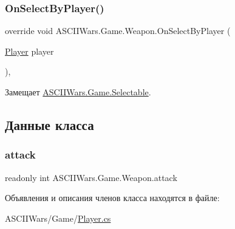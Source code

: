 \subsubsection{\texorpdfstring{On\+Select\+By\+Player()}{OnSelectByPlayer()}}
{\footnotesize\ttfamily override void A\+S\+C\+I\+I\+Wars.\+Game.\+Weapon.\+On\+Select\+By\+Player (\begin{DoxyParamCaption}\item[{\hyperlink{class_a_s_c_i_i_wars_1_1_game_1_1_player}{Player}}]{player }\end{DoxyParamCaption})\hspace{0.3cm}{\ttfamily [inline]}, {\ttfamily [virtual]}}



Замещает \hyperlink{class_a_s_c_i_i_wars_1_1_game_1_1_selectable_a95bdcf05ef9ea5f39c81ddd96294968a}{A\+S\+C\+I\+I\+Wars.\+Game.\+Selectable}.



\subsection{Данные класса}
\hypertarget{class_a_s_c_i_i_wars_1_1_game_1_1_weapon_a70166ce84757794de92f0a52de55bb04}{}\label{class_a_s_c_i_i_wars_1_1_game_1_1_weapon_a70166ce84757794de92f0a52de55bb04} 
\subsubsection{\texorpdfstring{attack}{attack}}
{\footnotesize\ttfamily readonly int A\+S\+C\+I\+I\+Wars.\+Game.\+Weapon.\+attack}



Объявления и описания членов класса находятся в файле\+:\begin{DoxyCompactItemize}
\item 
A\+S\+C\+I\+I\+Wars/\+Game/\hyperlink{_player_8cs}{Player.\+cs}\end{DoxyCompactItemize}

